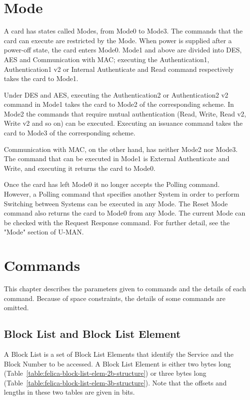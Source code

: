 \documentclass[a4paper,11pt]{report}
\begin{document}
\chapter{Mode}

A card has states called Modes, from Mode0 to Mode3. The commands that the card can execute are restricted by the Mode. When power is supplied after a power-off state, the card enters Mode0. Mode1 and above are divided into DES, AES and Communication with MAC; executing the Authentication1, Authentication1 v2 or Internal Authenticate and Read command respectively takes the card to Mode1.

Under DES and AES, executing the Authentication2 or Authentication2 v2 command in Mode1 takes the card to Mode2 of the corresponding scheme. In Mode2 the commands that require mutual authentication (Read, Write, Read v2, Write v2 and so on) can be executed. Executing an issuance command takes the card to Mode3 of the corresponding scheme.

Communication with MAC, on the other hand, has neither Mode2 nor Mode3. The command that can be executed in Mode1 is External Authenticate and Write, and executing it returns the card to Mode0.

Once the card has left Mode0 it no longer accepts the Polling command. However, a Polling command that specifies another System in order to perform Switching between Systems can be executed in any Mode. The Reset Mode command also returns the card to Mode0 from any Mode. The current Mode can be checked with the Request Response command. For further detail, see the "Mode" section of U-MAN\cite{felica-usersmanual-en}.

\chapter{Commands}

This chapter describes the parameters given to commands and the details of each command. Because of space constraints, the details of some commands are omitted.

\section{Block List and Block List Element}

A Block List is a set of Block List Elements that identify the Service and the Block Number to be accessed. A Block List Element is either two bytes long (Table~\ref{table:felica-block-list-elem-2b-structure}) or three bytes long (Table~\ref{table:felica-block-list-elem-3b-structure}). Note that the offsets and lengths in these two tables are given in bits.
\end{document}
